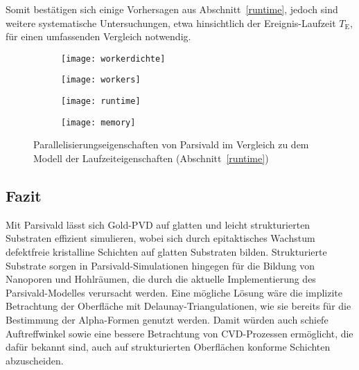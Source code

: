 Somit bestätigen sich einige Vorhersagen aus Abschnitt~\ref{runtime}, jedoch sind weitere systematische Untersuchungen, etwa hinsichtlich der Ereignis-Laufzeit $T_\text{E}$, für einen umfassenden Vergleich notwendig.

\begin{figure}[t]
  \centering
  \captionsetup[subfigure]{singlelinecheck=false}
  \def\subfigwidth{7cm}
  \begin{subfigure}[t]{\subfigwidth}
    \texttt{[image: workerdichte]}
    \label{fig:goldscala-density}
  \end{subfigure}
  \hfill
  \begin{subfigure}[t]{\subfigwidth}
    \texttt{[image: workers]}
    \label{fig:goldscala-workers}
  \end{subfigure}

  \vspace{1em}

  \begin{subfigure}[t]{\subfigwidth}
    \texttt{[image: runtime]}
    \label{fig:goldscala-runtime}
  \end{subfigure}
  \hfill
  \begin{subfigure}[t]{\subfigwidth}
    \texttt{[image: memory]}
    \label{fig:goldscala-memory}
  \end{subfigure}
  \caption[Vergleich der Parallelisierbarkeit zwischen dem Modell und PVD-Simulationen]{Parallelisierungseigenschaften von Parsivald im Vergleich zu dem Modell der Laufzeiteigenschaften (Abschnitt~\ref{runtime})}
  \label{fig:goldscala}
\end{figure}

\subsection{Fazit}

Mit Parsivald lässt sich Gold-PVD auf glatten und leicht strukturierten Substraten effizient simulieren, wobei sich durch epitaktisches Wachstum defektfreie kristalline Schichten auf glatten Substraten bilden.
Strukturierte Substrate sorgen in Parsivald-Simulationen hingegen für die Bildung von Nanoporen und Hohlräumen, die durch die aktuelle Implementierung des Parsivald-Modelles verursacht werden.
Eine mögliche Lösung wäre die implizite Betrachtung der Oberfläche mit Delaunay-Triangulationen, wie sie bereits für die Bestimmung der Alpha-Formen genutzt werden.
Damit würden auch schiefe Auftreffwinkel sowie eine bessere Betrachtung von CVD-Prozessen ermöglicht, die dafür bekannt sind, auch auf strukturierten Oberflächen konforme Schichten abzuscheiden\cite{granneman_thin_1993}.
